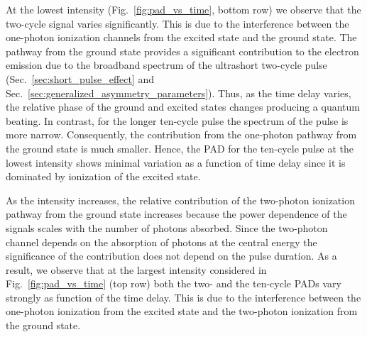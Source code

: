 At the lowest intensity (Fig.~\ref{fig:pad_vs_time}, bottom row) we observe that the two-cycle signal varies significantly. This is due to the interference between the one-photon ionization channels from the excited state and the ground state. The pathway from the ground state provides a significant contribution to the electron emission due to the broadband spectrum of the ultrashort two-cycle pulse (Sec.~\ref{sec:short_pulse_effect} and Sec.~\ref{sec:generalized_asymmetry_parameters}). Thus, as the time delay varies, the relative phase of the ground and excited states changes producing a quantum beating. In contrast, for the longer ten-cycle pulse the spectrum of the pulse is more narrow. Consequently, the contribution from the one-photon pathway from the ground state is much smaller. Hence, the PAD for the ten-cycle pulse at the lowest intensity shows minimal variation as a function of time delay since it is dominated by ionization of the excited state. 

As the intensity increases, the relative contribution of the two-photon ionization pathway from the ground state increases because the power dependence of the signals scales with the number of photons absorbed. Since the two-photon channel depends on the absorption of photons at the central energy the significance of the contribution does not depend on the pulse duration. As a result, we observe that at the largest intensity considered in Fig.~\ref{fig:pad_vs_time} (top row) both the two- and the ten-cycle PADs vary strongly as function of the time delay. This is due to the interference between the one-photon ionization from the excited state and the two-photon ionization from the ground state.

